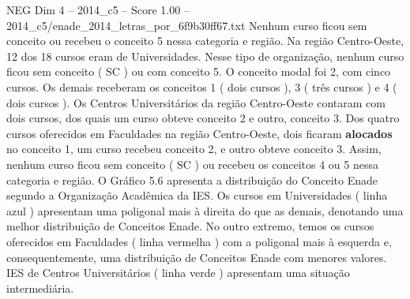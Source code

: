 \begin{textsample}{NEG Dim 4 – 2014\_c5 – Score 1.00 – 2014\_c5/enade\_2014\_letras\_por\_6f9b30ff67.txt}
Nenhum curso ficou sem conceito ou recebeu o conceito 5 nessa categoria e região.
Na região Centro-Oeste, 12 dos 18 cursos eram de Universidades.
Nesse tipo de organização, nenhum curso ficou sem conceito ( SC ) ou com conceito 5.
O conceito modal foi 2, com cinco cursos.
Os demais receberam os conceitos 1 ( dois cursos ), 3 ( três cursos ) e 4 ( dois cursos ).
Os Centros Universitários da região Centro-Oeste contaram com dois cursos, dos quais um curso obteve conceito 2 e outro, conceito 3.
Dos quatro cursos oferecidos em Faculdades na região Centro-Oeste, dois ficaram \textbf{alocados} no conceito 1, um curso recebeu conceito 2, e outro obteve conceito 3.
Assim, nenhum curso ficou sem conceito ( SC ) ou recebeu os conceitos 4 ou 5 nessa categoria e região.
O Gráfico 5.6 apresenta a distribuição do Conceito Enade segundo a Organização Acadêmica da IES.
Os cursos em Universidades ( linha azul ) apresentam uma poligonal mais à direita do que as demais, denotando uma melhor distribuição de Conceitos Enade.
No outro extremo, temos os cursos oferecidos em Faculdades ( linha vermelha ) com a poligonal mais à esquerda e, consequentemente, uma distribuição de Conceitos Enade com menores valores.
IES de Centros Universitários ( linha verde ) apresentam uma situação intermediária.

\end{textsample}
